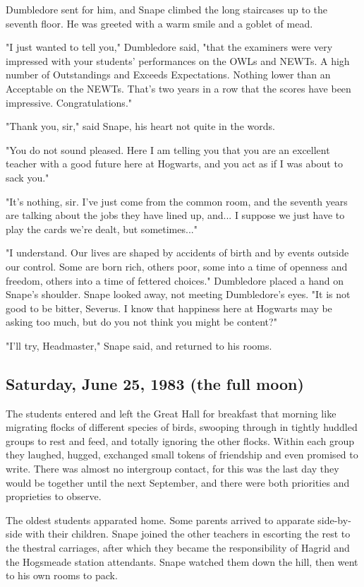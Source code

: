 \documentclass[a4paper,11pt]{article}
\begin{document}
Dumbledore sent for him, and Snape climbed the long staircases up to the seventh floor. He was greeted with a warm smile and a goblet of mead.

"I just wanted to tell you," Dumbledore said, "that the examiners were very impressed with your students' performances on the OWLs and NEWTs. A high number of Outstandings and Exceeds Expectations. Nothing lower than an Acceptable on the NEWTs. That's two years in a row that the scores have been impressive. Congratulations."

"Thank you, sir," said Snape, his heart not quite in the words.

"You do not sound pleased. Here I am telling you that you are an excellent teacher with a good future here at Hogwarts, and you act as if I was about to sack you."

"It's nothing, sir. I've just come from the common room, and the seventh years are talking about the jobs they have lined up, and... I suppose we just have to play the cards we're dealt, but sometimes..."

"I understand. Our lives are shaped by accidents of birth and by events outside our control. Some are born rich, others poor, some into a time of openness and freedom, others into a time of fettered choices." Dumbledore placed a hand on Snape's shoulder. Snape looked away, not meeting Dumbledore's eyes. "It is not good to be bitter, Severus. I know that happiness here at Hogwarts may be asking too much, but do you not think you might be content?"

"I'll try, Headmaster," Snape said, and returned to his rooms.

\subsection{Saturday, June 25, 1983 (the full moon)}

The students entered and left the Great Hall for breakfast that morning like migrating flocks of different species of birds, swooping through in tightly huddled groups to rest and feed, and totally ignoring the other flocks. Within each group they laughed, hugged, exchanged small tokens of friendship and even promised to write. There was almost no intergroup contact, for this was the last day they would be together until the next September, and there were both priorities and proprieties to observe.

The oldest students apparated home. Some parents arrived to apparate side-by-side with their children. Snape joined the other teachers in escorting the rest to the thestral carriages, after which they became the responsibility of Hagrid and the Hogsmeade station attendants. Snape watched them down the hill, then went to his own rooms to pack.
\end{document}
